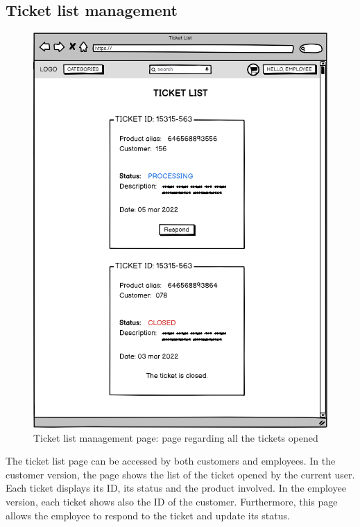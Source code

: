 \subsection{Ticket list management}
    \begin{figure}[H]
        \centering
        \includegraphics[width=\textwidth,height=0.7\textheight,keepaspectratio]{mockups/ticketPageMockup.png}
            \caption{Ticket list management page: page regarding all the tickets opened}
            \label{fig:TicketPage}
    \end{figure}
The ticket list page can be accessed by both customers and employees. In the customer version, the page shows the list of the ticket opened by the current user. Each ticket displays its ID, its status and the product involved. In the employee version, each ticket shows also the ID of the customer. Furthermore, this page allows the employee to respond to the ticket and update its status.



